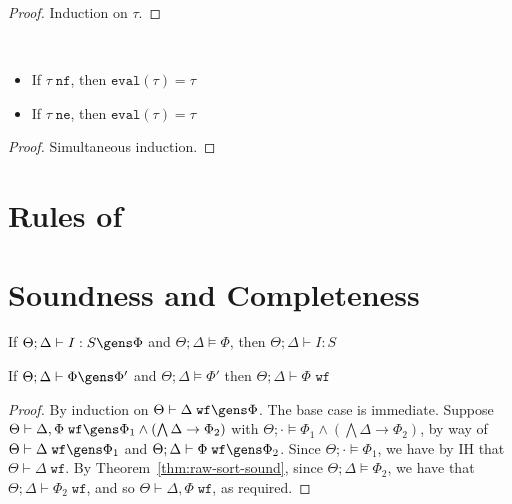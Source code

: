 \idxsubsteval*
\begin{proof}
Induction on $\tau$.
\end{proof}


\normthm*


\begin{theorem}
~\begin{itemize}
  \item If $\tau \; \texttt{nf}$, then $\texttt{eval}(\tau) = \tau$
  \item If $\tau \; \texttt{ne}$, then $\texttt{eval}(\tau) = \tau$
\end{itemize}
\label{thm:norm-idemp}
\end{theorem}
\begin{proof}
Simultaneous induction.
\end{proof}

\section{Rules of \bilambdaamor}

\section{Soundness and Completeness}

\begin{theorem}
If $\Theta;\Delta \vdash I : S \gens \Phi$ and $\Theta;\Delta \vDash \Phi$, then $\Theta;\Delta \vdash I : S$ 
\label{thm:raw-sort-sound}
\end{theorem}


\begin{theorem}
If $\Theta ; \Delta \vdash \Phi \gens \Phi'$ and $\Theta ; \Delta \vDash \Phi'$ then $\Theta ; \Delta \vdash \Phi \texttt{ wf}$
\label{thm:raw-constr-sound}
\end{theorem}


\idxctxwfsound*
\begin{proof}
By induction on $\Theta \vdash \Delta \; \texttt{wf} \gens \Phi$. The base case is immediate. Suppose $\Theta \vdash \Delta, \Phi \; \texttt{wf} \gens \Phi_1 \wedge (\bigwedge \Delta \to \Phi_2)$ with $\Theta ; \cdot \vDash \Phi_1 \wedge (\bigwedge \Delta \to \Phi_2)$, by way of
$\Theta \vdash \Delta \; \texttt{wf} \gens \Phi_1$ and $\Theta ; \Delta \vdash \Phi \; \texttt{wf} \gens \Phi_2$.
Since $\Theta ; \cdot \vDash \Phi_1$, we have by IH that $\Theta \vdash \Delta \; \texttt{wf}$. By Theorem~\ref{thm:raw-sort-sound}, since $\Theta ; \Delta \vDash \Phi_2$, we have that $\Theta ; \Delta \vdash \Phi_2 \; \texttt{wf}$, and so $\Theta \vdash \Delta, \Phi \; \texttt{wf}$, as required.
\end{proof}

